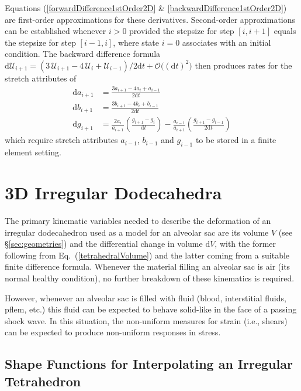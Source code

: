 Equations (\ref{forwardDifference1stOrder2D} \& \ref{backwardDifference1stOrder2D}) are first-order approximations for these derivatives.  Second-order approximations can be established whenever $i > 0$ provided the stepsize for step $[i, i+1]$ equals the stepsize for step $[i-1, i]$, where state $i=0$ associates with an initial condition.  The backward difference formula  $\mathrm{d} \boldsymbol{\mathcal{U}}_{i+1} = ( 3 \, \boldsymbol{\mathcal{U}}_{i+1} -  4 \, \boldsymbol{\mathcal{U}}_{i} + \boldsymbol{\mathcal{U}}_{i-1} ) / 2\mathrm{d}t + \mathcal{O} \bigl( (\mathrm{d}t)^2 \bigr)$ then produces rates for the stretch attributes of
\begin{equation}
\begin{aligned}
\mathrm{d} a_{i+1} & 
= \frac {3a_{i+1} - 4a_i +  a_{i-1}}{2\mathrm{d}t} \\ 
\mathrm{d} b_{i+1} & 
= \frac {3b_{i+1} - 4b_i +  b_{i-1}}{2\mathrm{d}t} \\
\mathrm{d} g_{i+1} & 
= \frac{2a_i} {a_{i+1}} \left(\frac{g_{i+1} - g_{i}}{\mathrm{d}t} \right) - \frac{a_{i-1}}{a_{i+1}} \left( \frac{g_{i+1} - g_{i-1}}{2\mathrm{d}t} \right) 
\end{aligned}
\label{backwardDifference2ndOrder2D}
\end{equation}
which require stretch attributes $a_{i-1}$, $b_{i-1}$ and $g_{i-1}$ to be stored in a finite element setting.


\section{3D Irregular Dodecahedra}

The primary kinematic variables needed to describe the deformation of an irregular dodecahedron used as a model for an alveolar sac are its volume $V$ (see \S\ref{sec:geometries}) and the differential change in volume $\mathrm{d}V$, with the former following from Eq.~(\ref{tetrahedralVolume}) and the latter coming from a suitable finite difference formula.  Whenever the material filling an alveolar sac is air (its normal healthy condition), no further breakdown of these kinematics is required.  

However, whenever an alveolar sac is filled with fluid (blood, interstitial fluids, pflem, etc.) this fluid can be expected to behave solid-like in the face of a passing shock wave.  In this situation, the non-uniform measures for strain (i.e., shears) can be expected to produce non-uniform responses in stress.

\subsection{Shape Functions for Interpolating an Irregular Tetrahedron}

